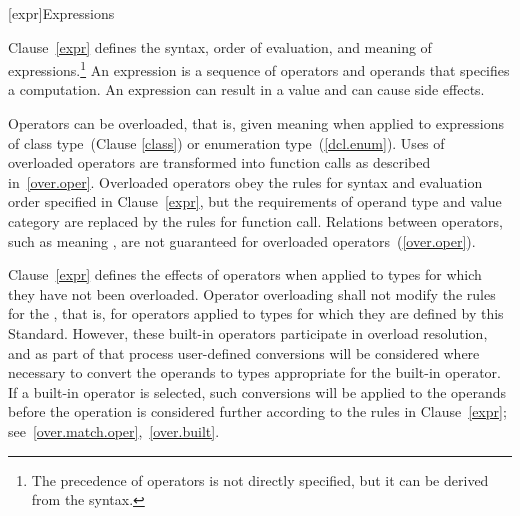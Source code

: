 [expr]{Expressions}


%
%
%
%
%
%
%

\pnum
{}%
\begin{note}
Clause~\ref{expr} defines the syntax, order of evaluation, and meaning
of expressions.\footnote{The precedence of operators is not directly specified, but it can be
derived from the syntax.}
An expression is a sequence of operators and operands that specifies a
computation. An expression can result in a value and can cause side
effects.
\end{note}

\pnum
{}%
\begin{note}
Operators can be overloaded, that is, given meaning when applied to
expressions of class type~(Clause \ref{class}) or enumeration
type~(\ref{dcl.enum}). Uses of overloaded operators are transformed into
function calls as described in~\ref{over.oper}. Overloaded operators
obey the rules for syntax and evaluation order specified in Clause~\ref{expr},
but the requirements of operand type and value category are replaced
by the rules for function call. Relations between operators, such as
 meaning , are not guaranteed for overloaded
operators~(\ref{over.oper}).
\end{note}

\pnum
Clause~\ref{expr} defines the effects of operators when applied to types
for which they have not been overloaded. Operator overloading shall not
modify the rules for the ,
that is, for operators applied to types for which they are defined by this
Standard. However, these built-in operators participate in overload
resolution, and as part of that process user-defined conversions will be
considered where necessary to convert the operands to types appropriate
for the built-in operator. If a built-in operator is selected, such
conversions will be applied to the operands before the operation is
considered further according to the rules in Clause~\ref{expr};
see~\ref{over.match.oper},~\ref{over.built}.

